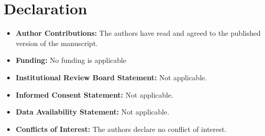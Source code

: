 \documentclass{article}
\begin{document}
\section*{Declaration }
\begin{itemize}
  \item {\bf Author Contributions:}   The authors have read and agreed to the published version of the manuscript.
  \item {\bf Funding:} No funding is applicable
  \item  {\bf Institutional Review Board Statement:} Not applicable.
  \item {\bf Informed Consent Statement:} Not applicable.
  \item {\bf Data Availability Statement:} Not applicable.
  \item {\bf Conflicts of Interest:} The authors declare no conflict of interest.
\end{itemize}








\end{document}
